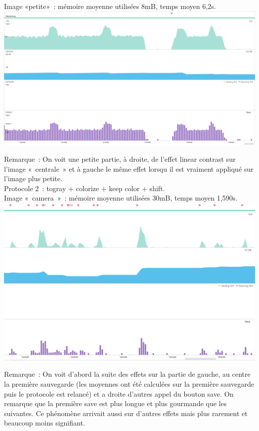 \documentclass[12pt]{article}
\begin{document}
    Image «petite» : mémoire moyenne utilisées 8mB, temps moyen 6,2s.\\

    \includegraphics{petite-linear}


    Remarque :
    On voit une petite partie, à droite, de l’effet linear contrast sur l’image « centrale » et à gauche le même effet lorsqu il est vraiment appliqué sur l’image plus petite.\\


    Protocole 2 : togray + colorize + keep color + shift.\\

    Image « camera » : mémoire moyenne utilisées 30mB, temps moyen 1,590s.\\


    \includegraphics{camera-serie}

    Remarque :
    On voit d’abord la suite des effets sur la partie de gauche, au centre la première sauvegarde (les moyennes ont été calculées sur la première sauvegarde puis le protocole est relancé) et a droite d’autres appel du bouton save. On remarque que la première save est plus longue et plus gourmande  que les suivantes. Ce phénomène arrivait aussi sur d’autres effets mais plus rarement et beaucoup moins signifiant.\\
\end{document}
